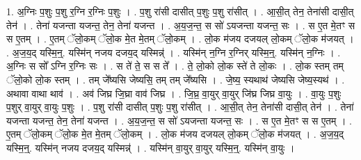 \documentclass[17pt]{extarticle}
\begin{document}
1. अ॒ग्निः प॒शुः प॒शु र॒ग्नि र॒ग्निः प॒शुः । . प॒शु रा॑सी दासीत् प॒शुः प॒शु रा॑सीत् । . आ॒सी॒त् तेन॒ तेना॑सी दासी॒त् तेन॑ । . तेना॑ यजन्ता यजन्त॒ तेन॒ तेना॑ यजन्त । . अ॒य॒ज॒न्त॒ स सो॑ ऽयजन्ता यजन्त॒ सः । . स ए॒त मे॒तꣳ स स ए॒तम् । . ए॒तम् ॅलो॒कम् ॅलो॒क मे॒त मे॒तम् ॅलो॒कम् । . लो॒क म॑जय दजयल् लो॒कम् ॅलो॒क म॑जयत् । . अ॒ज॒य॒द् यस्मि॒न्॒. यस्मि॑न् नजय दजय॒द् यस्मिन्न्॑ । . यस्मि॑न् न॒ग्नि र॒ग्निर् यस्मि॒न्॒. यस्मि॑न् न॒ग्निः । . अ॒ग्निः स सो᳚ ऽग्नि र॒ग्निः सः । . स ते॑ ते॒ स स ते᳚ । . ते॒ लो॒को लो॒क स्ते॑ ते लो॒कः । . लो॒क स्तम् तम् ॅलो॒को लो॒क स्तम् । . तम् जे᳚ष्यसि जेष्यसि॒ तम् तम् जे᳚ष्यसि । . जे॒ष्य॒ स्यथाथ॑ जेष्यसि जेष्य॒स्यथ॑ । . अथावा वाथा थाव॑ । . अव॑ जिघ्र जि॒घ्रा वाव॑ जिघ्र । . जि॒घ्र॒ वा॒युर् वा॒युर् जि॑घ्र जिघ्र वा॒युः । . वा॒युः प॒शुः प॒शुर् वा॒युर् वा॒युः प॒शुः । . प॒शु रा॑सी दासीत् प॒शुः प॒शु रा॑सीत् । . आ॒सी॒त् तेन॒ तेना॑सी दासी॒त् तेन॑ । . तेना॑ यजन्ता यजन्त॒ तेन॒ तेना॑ यजन्त । . अ॒य॒ज॒न्त॒ स सो॑ ऽयजन्ता यजन्त॒ सः । . स ए॒त मे॒तꣳ स स ए॒तम् । . ए॒तम् ॅलो॒कम् ॅलो॒क मे॒त मे॒तम् ॅलो॒कम् । . लो॒क म॑जय दजयल् लो॒कम् ॅलो॒क म॑जयत् । . अ॒ज॒य॒द् यस्मि॒न्॒. यस्मि॑न् नजय दजय॒द् यस्मिन्न्॑ । . यस्मि॑न् वा॒युर् वा॒युर् यस्मि॒न्॒. यस्मि॑न् वा॒युः । \newline
\end{document}

